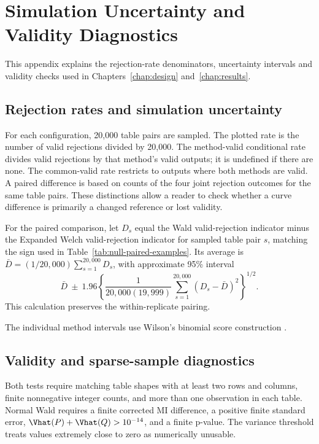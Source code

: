 \chapter{Simulation Uncertainty and Validity Diagnostics}
\label{app:diagnostics}

This appendix explains the rejection-rate denominators, uncertainty intervals
and validity checks used in Chapters~\ref{chap:design} and~\ref{chap:results}.

\section{Rejection rates and simulation uncertainty}

For each configuration, 20,000 table pairs are sampled. The plotted rate is
the number of valid rejections divided by 20,000. The method-valid conditional rate divides
valid rejections by that method's valid outputs; it is undefined if there are
none. The common-valid rate restricts to outputs where both methods are
valid. A paired difference is based on counts of the four joint rejection
outcomes for the same table pairs. These distinctions allow a reader to
check whether a curve difference is primarily a changed reference or lost
validity.

For the paired comparison, let \(D_s\) equal the Wald valid-rejection
indicator minus the Expanded Welch valid-rejection indicator for sampled
table pair \(s\), matching the sign used in
Table~\ref{tab:null-paired-examples}. Its average is
\(\bar D=(1/20{,}000)\sum_{s=1}^{20{,}000}D_s\), with approximate 95\% interval
\begin{equation}
  \bar D\ \pm\ 1.96
  \left\{
    \frac{1}{20{,}000(19{,}999)}
    \sum_{s=1}^{20{,}000}(D_s-\bar D)^2
  \right\}^{1/2}.
\end{equation}
This calculation preserves the within-replicate pairing.

The individual method intervals use Wilson's binomial score
construction \citep{wilson1927}.

\section{Validity and sparse-sample diagnostics}
\label{sec:validity-rules}

Both tests require matching table shapes with at least two rows and columns,
finite nonnegative integer counts, and more than one observation in each
table. Normal Wald requires a finite corrected MI difference, a positive
finite standard error, \(\Vhat(P)+\Vhat(Q)>10^{-14}\), and a finite p-value.
The variance threshold treats values extremely close to zero as numerically
unusable.

